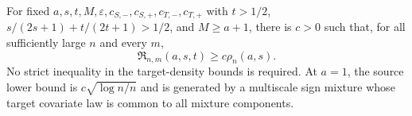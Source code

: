 For fixed \(a,s,t,M,\varepsilon,c_{S,-},c_{S,+},c_{T,-},c_{T,+}\) with \(t>1/2\), \(s/(2s+1)+t/(2t+1)>1/2\), and \(M\ge a+1\), there is \(c>0\) such that, for all sufficiently large \(n\) and every \(m\),
\[
\mathfrak R_{n,m}(a,s,t)\ge c\rho_n(a,s).
\]
No strict inequality in the target-density bounds is required. At \(a=1\), the source lower bound is \(c\sqrt{\log n/n}\) and is generated by a multiscale sign mixture whose target covariate law is common to all mixture components.